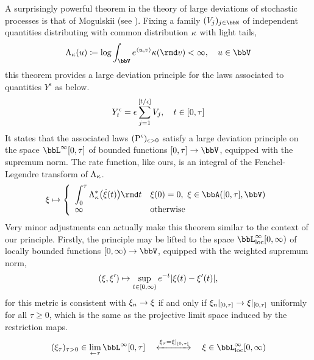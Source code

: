 A surprisingly powerful theorem in the theory of large deviations of stochastic processes is that of Mogulskii (see \cite[Theorems 5.1.2 and 5.1.19 and Exercise 5.122]{dembo2010}).
Fixing a family $(\V_j)_{j\in\bbN}$ of independent quantities distributing with common distribution $\kappa$ with light tails,
\begin{equation}
  \label{eq:cumulant-generating-function}
  \ode_\affDist(\momentVar) \defeq \log\int_\vecSpace e^\prj\momentVar\markVar \affDist(\rmd\markVar) < \infty, \quad \momentVar \in \vecSpace
\end{equation}
this theorem provides a large deviation principle for the laws associated to quantities $Y^\epsilon$ as below.
\begin{equation*}
  Y^\epsilon_t = \epsilon \sum_{j=1}^{[t/\epsilon]} V_j, \quad t \in [0,\tau]
\end{equation*}
It states that the associated laws $({\operatorname{P}}^\epsilon)_{\epsilon>0}$ satisfy a large deviation principle on the space $\bbL^\infty[0,\tau]$ of bounded functions $[0,\tau] \rightarrow \vecSpace$, equipped with the supremum norm.
The rate function, like ours, is an integral of the Fenchel-Legendre transform of $\Lambda_\kappa$.
\begin{equation*}
  \pathVar \mapsto \left\{\begin{array}{ll}
    \displaystyle\int_0^\tau \ode_\affDist^*\big(\dot\pathVar(t)\big) \rmd t & \pathVar(0) = 0, ~ \pathVar \in \acpathSpace{[0,\tau]}{\vecSpace}\\
    \infty & \text{otherwise}
  \end{array}\right.
\end{equation*}
Very minor adjustments can actually make this theorem similar to the context of our principle.
Firstly, the principle may be lifted to the space $\bbL^\infty_\loc[0,\infty)$ of locally bounded functions $[0,\infty) \rightarrow \vecSpace$, equipped with the weighted supremum norm,
\begin{equation*}
  (\xi, \xi') \mapsto \sup_{t\in [0,\infty)} e^{-t} |\xi(t) - \xi'(t)|,
\end{equation*}
for this metric is consistent with $\xi_n \rightarrow \xi$ if and only if $\xi_n|_{[0,\tau]} \rightarrow \xi|_{[0,\tau]}$ uniformly for all $\tau \geq 0$, which is the same as the projective limit space induced by the restriction maps.
\[
  (\pathVar_\tau)_{\tau > 0} \in \lim\limits_{\leftarrow\tau} \bbL^\infty[0,\tau] \quad\xleftrightarrow{\pathVar_\tau = \pathVar|_{[0,\tau]}}\quad \pathVar \in \bbL^\infty_\loc[0,\infty)
\]
